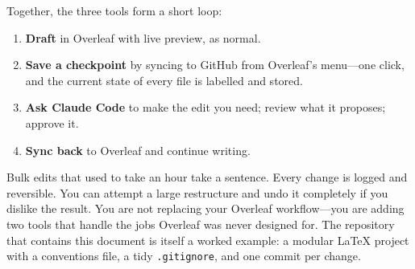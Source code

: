 Together, the three tools form a short loop:

\begin{enumerate}[leftmargin=*]
  \item \textbf{Draft} in Overleaf with live preview, as normal.
  \item \textbf{Save a checkpoint} by syncing to GitHub from Overleaf's menu---one click, and the current state of every file is labelled and stored.
  \item \textbf{Ask Claude Code} to make the edit you need; review what it proposes; approve it.
  \item \textbf{Sync back} to Overleaf and continue writing.
\end{enumerate}

Bulk edits that used to take an hour take a sentence. Every change is logged and reversible. You can attempt a large restructure and undo it completely if you dislike the result. You are not replacing your Overleaf workflow---you are adding two tools that handle the jobs Overleaf was never designed for. The repository that contains this document is itself a worked example: a modular \LaTeX{} project with a conventions file, a tidy \verb|.gitignore|, and one commit per change.
